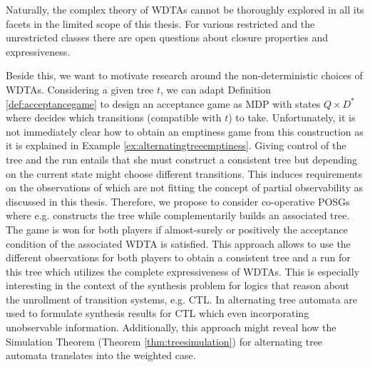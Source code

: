 Naturally, the complex theory of \acp{WDTA} cannot be thoroughly explored in
all its facets in the limited scope of this thesis. For various restricted and
the unrestricted classes there are open questions about closure properties and
expressiveness.

Beside this, we want to motivate research around the non-deterministic choices
of \acp{WDTA}. Considering a given tree $t$, we can adapt Definition
\ref{def:acceptancegame} to design an acceptance game as \ac{MDP} with states
$Q\times D^{*}$ where \eve{} decides which transitions (compatible with $t$) to 
take. Unfortunately, it is not immediately clear how to obtain an emptiness
game from this construction as it is explained in Example
\ref{ex:alternatingtreeemptiness}.  Giving \eve{} control of the tree and the
run entails that she must construct a consistent tree but depending on the
current state might choose different transitions. This induces requirements on
the observations of \eve{} which are not fitting the concept of partial
observability as discussed in this thesis.  Therefore, we propose to consider
co-operative \acp{POSG} where e.g. \eve{} constructs the tree while \adam{}
complementarily builds an associated tree.  The game is won for both players if
almost-surely or positively the acceptance condition of the associated
\ac{WDTA} is satisfied. This approach allows to use the different observations
for both players to obtain a consistent tree and a run for this tree which
utilizes the complete expressiveness of \acp{WDTA}.  This is especially
interesting in the context of the synthesis problem for logics that reason
about the unrollment of transition systems, e.g. \textsc{CTL}. In
\cite{ChurchsProblemRevisited} alternating tree automata are used to formulate
synthesis results for \textsc{CTL} which even incorporating unobservable
information. Additionally, this approach might reveal how the Simulation
Theorem (Theorem \ref{thm:treesimulation}) for alternating tree automata
translates into the weighted case.

